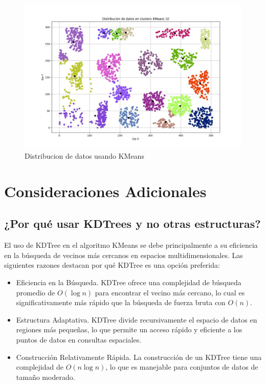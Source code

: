\documentclass[conference]{IEEEtran}
\begin{document}
\begin{figure}[htbp]
    \centering
    \includegraphics[width=1\linewidth]{figures/kmeans10.jpeg} %
    \caption{Distribucion de datos usando KMeans}
    \label{fig:kmeans10}
\end{figure}

\section{Consideraciones Adicionales}
\subsection{¿Por qué usar KDTrees y no otras estructuras?}
El uso de KDTree en el algoritmo KMeans se debe principalmente a su eficiencia en la búsqueda de vecinos más cercanos en espacios multidimensionales. Las siguientes razones destacan por qué KDTree es una opción preferida:
\begin{itemize}
    \item{Eficiencia en la Búsqueda.} KDTree ofrece una complejidad de búsqueda promedio de \(O(\log n)\) para encontrar el vecino más cercano, lo cual es significativamente más rápido que la búsqueda de fuerza bruta con \(O(n)\).
    \item{Estructura Adaptativa.} KDTree divide recursivamente el espacio de datos en regiones más pequeñas, lo que permite un acceso rápido y eficiente a los puntos de datos en consultas espaciales.
    \item{Construcción Relativamente Rápida.} La construcción de un KDTree tiene una complejidad de \(O(n \log n)\), lo que es manejable para conjuntos de datos de tamaño moderado.
\end{itemize}
\end{document}
